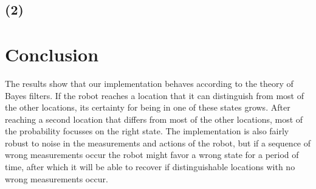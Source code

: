 \documentclass[10pt,a4paper]{article}
\begin{document}
\subsection{(2)}
	
	
	\section{Conclusion}
	The results show that our implementation behaves according to the theory of Bayes filters. If the robot reaches a location that it can distinguish from most of the other locations, its certainty for being in one of these states grows. After reaching a second location that differs from most of the other locations, most of the probability focusses on the right state. The implementation is also fairly robust to noise in the measurements and actions of the robot, but if a sequence of wrong measurements occur the robot might favor a wrong state for a period of time, after which it will be able to recover if distinguishable locations with no wrong measurements occur.
	
\end{document}
